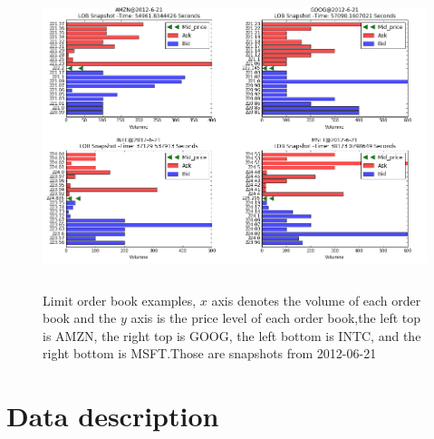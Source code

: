 \begin{figure}[hbtp]
  \begin{center}
    \includegraphics[width=4.5in,height=3.5in]{figures/snapshot.png}
  \end{center}
\caption{Limit order book examples, $x$ axis denotes the volume of each order book and the $y$ axis is the price level of each order book,the left top is AMZN, the right top is GOOG, the left bottom is INTC, and the right bottom is MSFT.Those are snapshots from 2012-06-21} \label{fig:order_snapshot}
\end{figure}

\section{Data description}

